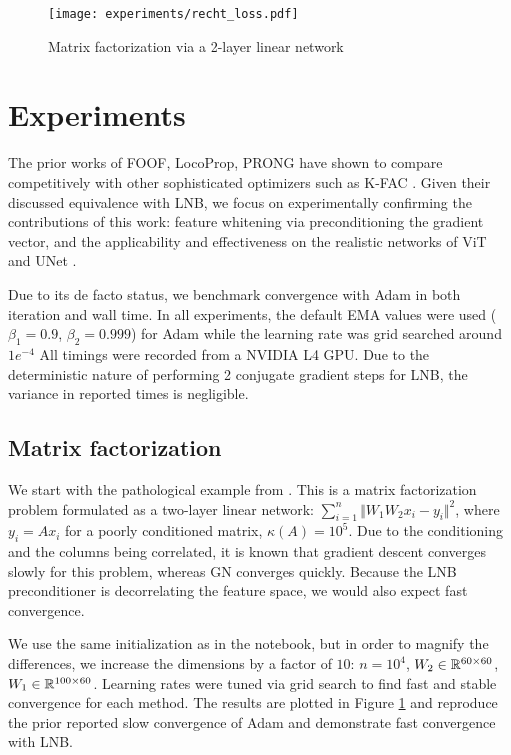 \begin{figure}[t]
    \begin{center}
    \centerline{\texttt{[image: experiments/recht\_loss.pdf]}}
    \caption{Matrix factorization via a 2-layer linear network}
    \label{recht}
\end{center}
\end{figure}

\section{Experiments}
\label{sec:experiments}
The prior works of FOOF, LocoProp, PRONG have shown to compare competitively
with other sophisticated optimizers such as K-FAC \citep{martens2015}.
Given their discussed equivalence with LNB, we focus on experimentally confirming
the contributions of this work: feature whitening via preconditioning the
gradient vector, and the applicability and effectiveness on
the realistic networks of ViT \citep{vit} and UNet \citep{unet}.

Due to its de facto status, we benchmark convergence with Adam in both
iteration and wall time.
In all experiments, the default EMA values were used ($\beta_1=0.9$, $\beta_2=0.999$)
for Adam while the learning rate was grid searched around $1e^{-4}$
All timings were recorded from a NVIDIA L4 GPU. Due to the deterministic nature of performing
2 conjugate gradient steps for LNB, the variance in reported times is negligible.


\subsection{Matrix factorization}
We start with the pathological example from \citet{recht}. This is a matrix
factorization problem formulated as a two-layer linear network:
$\sum_{i=1}^{n} \Vert W_1 W_2 x_i - y_i\Vert^2$,
where $y_i=Ax_i$ for a poorly conditioned matrix, $\kappa(A)=10^5$. Due to the conditioning
and the columns being correlated, it is known that gradient descent converges slowly for this
problem, whereas GN converges quickly. Because the LNB preconditioner is decorrelating
the feature space, we would also expect fast convergence.

We use the same initialization as in the notebook, but in order to magnify the differences,
we increase the dimensions by a factor of $10$: $n=10^4$,
$W_2 \in {\mathbb{R}}^{60 \times 60}$, $W_1 \in {\mathbb{R}}^{100 \times 60}$. Learning rates were tuned via
grid search to find fast and stable convergence for each method. The results are plotted in Figure \ref{recht}
and reproduce the prior reported slow convergence of Adam and demonstrate fast convergence with LNB.

